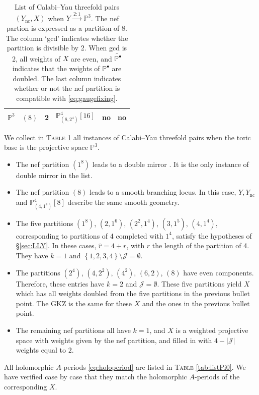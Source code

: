 \documentclass[12pt,a4paper,oneside]{amsart}
\numberwithin{equation}{section}
\theoremstyle{definition}
\theoremstyle{remark}
\newcommand{\cP}{\mathbb{P}}
\newcommand{\Ync}{Y_{\mathrm{nc}}}
\begin{document}
\begin{table}[th]
\begin{tabular}{|c |c |c |c | c| c|}
	$\cP^{3}$ & $(8)$ & 2 & $\cP^{4}_{(8,2^4)} [16]$ & no & no \\
	\hline
\end{tabular}
\caption{List of Calabi--Yau threefold pairs $(\Ync, X)$ when $Y \xrightarrow{ \ 2:1 \ } \cP^3$. The nef partion is expressed as a partition of $8$. The column `gcd' indicates whether the partition is divisible by 2. When gcd is 2, all weights of $X$ are even, and $\widetilde{\cP^{\bullet}}$ indicates that the weights of $\cP^{\bullet}$ are doubled. The last column indicates whether or not the nef partition is compatible with \eqref{eq:gaugefixing}.}
\label{tab:listCY3}
\end{table}\par

We collect in \textsc{Table} \ref{tab:listCY3} all instances of Calabi--Yau threefold pairs when the toric base is the projective space $\cP^3$.\par
\begin{itemize}
\item The nef partition $(1^8)$ leads to a double mirror \cite{Caldararu:2010ljp}. It is the only instance of double mirror in the list.
\item The nef partition $(8)$ leads to a smooth branching locus. In this case, $Y,\Ync$ and $\cP^4_{(4,1^4)} [8]$ describe the same smooth geometry.
\item The five partitions $(1^8)$, $(2,1^6)$, $(2^2,1^4)$, $(3,1^5)$, $(4,1^4)$, corresponding to partitions of 4 completed with $1^4$, satisfy the hypotheses of \S\ref{sec:LLY}. In these cases, $\hat{r}=4+r$, with $r$ the length of the partition of 4. They have $k=1$ and $\left\{ 1, 2,3, 4 \right\}\setminus \mathcal{J}=\emptyset$.
\item The partitions $(2^4)$, $(4,2^2)$, $(4^2)$, $(6,2)$, $(8)$ have even components. Therefore, these entries have $k=2$ and $\mathcal{J}= \emptyset$. These five partitions yield $X$ which has all weights doubled from the five partitions in the previous bullet point. The GKZ is the same for these $X$ and the ones in the previous bullet point.
\item The remaining nef partitions all have $k=1$, and $X$ is a weighted projective space with weights given by the nef partition, and filled in with $4-\lvert \mathcal{J}\rvert$ weights equal to $2$.
\end{itemize}
All holomorphic $A$-periods \eqref{eq:holoperiod} are listed in \textsc{Table} \ref{tab:listPi0}. We have verified case by case that they match the holomorphic $A$-periods of the corresponding $X$.\par
\end{document}
